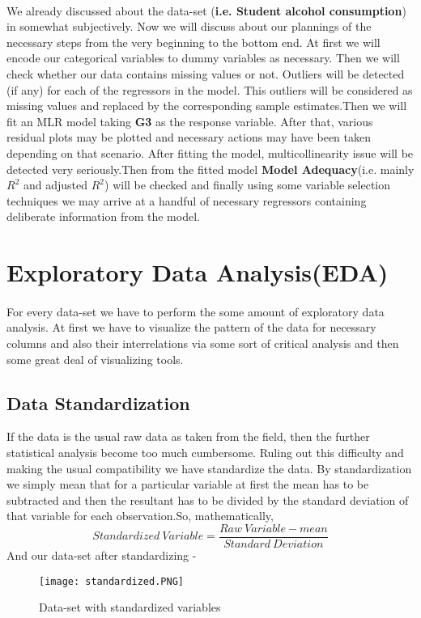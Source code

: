 \documentclass[A4paper,11pt]{report}
\begin{document}
	\paragraph{} We already discussed about the data-set (\textbf{i.e. Student alcohol consumption}) in somewhat subjectively. Now we will discuss about our plannings of the necessary steps from the very beginning to the bottom end. At first we will encode our categorical variables to dummy variables as necessary. Then we will check whether our data contains missing values or not. Outliers will be detected (if any) for each of the regressors in the model. This outliers will be considered as missing values and replaced by the corresponding sample estimates.Then we will fit an MLR model taking \textbf{G3} as the response variable. After that, various residual plots may be plotted and necessary actions may have been taken depending on that scenario. After fitting the model, multicollinearity issue will be detected very seriously.Then from the fitted model \textbf{Model Adequacy}(i.e. mainly $R^2$ and adjusted $R^2$) will be checked and finally using some variable selection techniques we may arrive at a handful of necessary regressors containing deliberate information from the model.
	
	\section{Exploratory Data Analysis(EDA)}
	\paragraph{} For every data-set we have to perform the some amount of exploratory data analysis. At first we have to visualize the pattern of the data for necessary columns and also their interrelations via some sort of critical analysis and then some great deal of visualizing tools.
	\subsection{Data Standardization}
	If the data is the usual raw data as taken from the field, then the further statistical analysis become too much cumbersome. Ruling out this difficulty and making the usual compatibility we have standardize the data. By standardization we simply mean that for a particular variable at first the mean has to be subtracted and then the resultant has to be divided by the standard deviation of that variable for each observation.So, mathematically,
	$$Standardized\ Variable = \frac{Raw\ Variable - mean}{Standard\ Deviation}$$
	And our data-set after standardizing -
	\begin{figure}[h]
		\texttt{[image: standardized.PNG]}
		\caption{Data-set with standardized variables}
	\end{figure}\\
\end{document}
